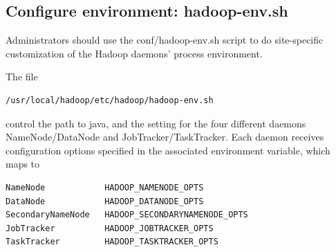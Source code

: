 \subsection{Configure environment: hadoop-env.sh}
\label{sec:hadoop-env.sh}

Administrators should use the conf/hadoop-env.sh script to do site-specific
customization of the Hadoop daemons' process environment.

The file
\begin{verbatim}
/usr/local/hadoop/etc/hadoop/hadoop-env.sh
\end{verbatim}
control the path to java, and the setting for the four different
daemons NameNode/DataNode and JobTracker/TaskTracker. Each daemon receives
configuration options specified in the associated environment variable, which
maps to
\begin{verbatim}
NameNode           	HADOOP_NAMENODE_OPTS
DataNode            HADOOP_DATANODE_OPTS
SecondaryNameNode   HADOOP_SECONDARYNAMENODE_OPTS
JobTracker          HADOOP_JOBTRACKER_OPTS
TaskTracker         HADOOP_TASKTRACKER_OPTS
\end{verbatim}

